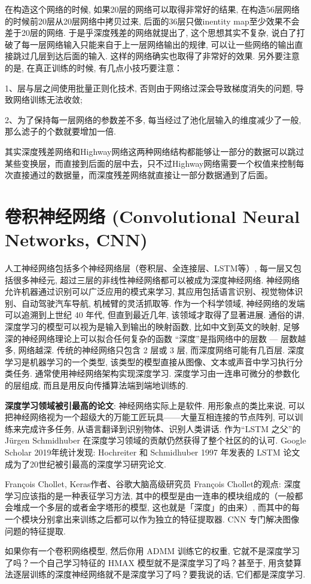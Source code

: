 在构造这个网络的时候, 如果20层的网络可以取得非常好的结果, 在构造56层网络的时候前20层从20层网络中拷贝过来, 后面的36层只做inentity map至少效果不会差于20层的网络.
于是乎深度残差的网络就提出了, 这个思想其实不复杂, 说白了打破了每一层网络输入只能来自于上一层网络输出的规律, 可以让一些网络的输出直接跳过几层到达后面的输入.
这样的网络确实也取得了非常好的效果. 另外要注意的是, 在真正训练的时候, 有几点小技巧要注意：

1、层与层之间使用批量正则化技术, 否则由于网络过深会导致梯度消失的问题, 导致网络训练无法收敛;

2、为了保持每一层网络的参数差不多, 每当经过了池化层输入的维度减少了一般, 那么滤子的个数就要增加一倍.

其实深度残差网络和Highway网络这两种网络结构都能够让一部分的数据可以跳过某些变换层，而直接到后面的层中去，只不过Highway网络需要一个权值来控制每次直接通过的数据量，而深度残差网络就直接让一部分数据通到了后面。
\section{卷积神经网络 (Convolutional Neural Networks, CNN)}
人工神经网络包括多个神经网络层（卷积层、全连接层、LSTM等）, 每一层又包括很多神经元, 超过三层的非线性神经网络都可以被成为深度神经网络.
神经网络允许机器通过识别可以广泛应用的模式来学习, 其应用包括语言识别、视觉物体识别、自动驾驶汽车导航, 机械臂的灵活抓取等. 作为一个科学领域, 神经网络的发端可以追溯到上世纪 40 年代, 但直到最近几年, 该领域才取得了显著进展.
通俗的讲, 深度学习的模型可以视为是输入到输出的映射函数, 比如中文到英文的映射, 足够深的神经网络理论上可以拟合任何复杂的函数
“深度”是指网络中的层数 — 层数越多, 网络越深. 传统的神经网络只包含 2 层或 3 层, 而深度网络可能有几百层.
深度学习是机器学习的一个类型, 该类型的模型直接从图像、文本或声音中学习执行分类任务. 通常使用神经网络架构实现深度学习.
深度学习由一连串可微分的参数化的层组成, 而且是用反向传播算法端到端地训练的.
\begin{remark}
\textbf{深度学习领域被引最高的论文}:
神经网络实际上是软件. 用形象点的类比来说, 可以把神经网络视为一个超级大的万能工匠玩具——大量互相连接的节点阵列, 可以训练来完成许多任务, 从语言翻译到识别物体、识别人类讲话.
作为“LSTM 之父”的 Jürgen Schmidhuber 在深度学习领域的贡献仍然获得了整个社区的的认可.
Google Scholar 2019年统计发现:  Hochreiter 和 Schmidhuber 1997 年发表的 LSTM 论文成为了20世纪被引最高的深度学习研究论文\cite{HochreiterNC1997}.
\end{remark}

François Chollet, Keras作者、谷歌大脑高级研究员 François Chollet的观点: 深度学习应该指的是一种表征学习方法, 其中的模型是由一连串的模块组成的（一般都会堆成一个多层的或者金字塔形的模型, 这也就是「深度」的由来）, 而其中的每一个模块分别拿出来训练之后都可以作为独立的特征提取器. CNN 专门解决图像问题的特征提取.
\begin{example}
  如果你有一个卷积网络模型, 然后你用 ADMM 训练它的权重, 它就不是深度学习了吗？一个自己学习特征的 HMAX 模型就不是深度学习了吗？甚至于, 用贪婪算法逐层训练的深度神经网络就不是深度学习了吗？要我说的话, 它们都是深度学习.
\end{example}

